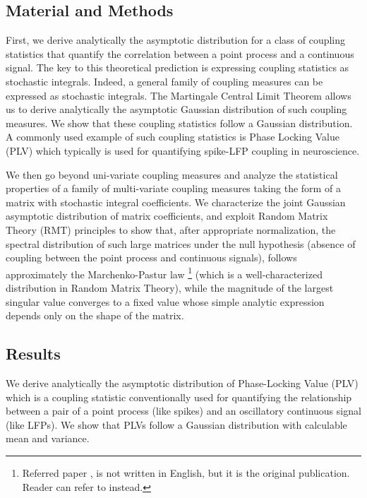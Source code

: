 \subsection*{Material and Methods}
First, we derive analytically the asymptotic distribution for a class of coupling statistics that quantify the correlation between a point process and a continuous signal.
The key to this theoretical prediction is expressing coupling statistics as stochastic integrals. 
Indeed, a general family of coupling measures can be expressed as stochastic integrals. 
The Martingale Central Limit Theorem allows us to derive analytically the asymptotic Gaussian distribution of such coupling measures. 
We show that these coupling statistics follow a Gaussian distribution. 
A commonly used example of such coupling statistics is Phase Locking Value (PLV) which typically is used for quantifying spike-LFP coupling in neuroscience.

We then go beyond uni-variate coupling measures and analyze the statistical properties of a family of multi-variate coupling measures taking the form of a matrix with stochastic integral coefficients.
We characterize the joint Gaussian asymptotic distribution of matrix coefficients,
and exploit Random Matrix Theory (RMT) principles to show that,
after appropriate normalization,
the spectral distribution of such large matrices under the null hypothesis
(absence of coupling between the point process and continuous signals),
follows approximately the Marchenko-Pastur law \citep{marcenkoDistributionEigenvaluesSets1967a}
\footnote{Referred paper \cite{marcenkoDistributionEigenvaluesSets1967a},
  is not written in English, but it is  the original publication.
  Reader can refer to \citet[Chapter
  2]{andersonIntroductionRandomMatrices2010} instead.}
(which is a well-characterized distribution in Random Matrix Theory),
while the magnitude of the largest singular value converges to a fixed value whose simple analytic expression depends only on the shape of the matrix.

\subsection*{Results}
We derive analytically the asymptotic distribution of Phase-Locking Value (PLV)
which is a coupling statistic conventionally used for quantifying the relationship between a pair of a point process (like spikes) and an oscillatory continuous signal (like LFPs).
We show that PLVs follow a Gaussian distribution with calculable mean and variance.

